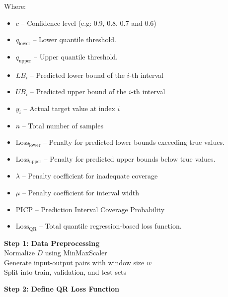 \begin{itemize}
    Where:
    \begin{itemize}
    \item $c$ – Confidence level (e.g: 0.9, 0.8, 0.7 and 0.6)
    \item $q_{\text{lower}}$ – Lower quantile threshold.
    \item $q_{\text{upper}}$ – Upper quantile threshold.
    \item $LB_i$ – Predicted lower bound of the $i$-th interval
    \item $UB_i$ – Predicted upper bound of the $i$-th interval
    \item $y_i$ – Actual target value at index $i$
    \item $n$ – Total number of samples
    \item $\text{Loss}_{\text{lower}}$ – Penalty for predicted lower bounds exceeding true values.
    \item $\text{Loss}_{\text{upper}}$ – Penalty for predicted upper bounds below true values.
    \item $\lambda$ – Penalty coefficient for inadequate coverage
    \item $\mu$ – Penalty coefficient for interval width
    \item $\text{PICP}$ – Prediction Interval Coverage Probability
    \item $\text{Loss}_{\text{QR}}$ – Total quantile regression-based loss function.
    \end{itemize}

        \begin{algorithm}[H]
        \footnotesize
        \SetAlgoCaptionSeparator{:}
    
    
        \textbf{Step 1: Data Preprocessing}\\
        Normalize $D$ using MinMaxScaler\\
        Generate input-output pairs with window size $w$\\
        Split into train, validation, and test sets
    
        \textbf{Step 2: Define QR Loss Function}\\
    

\end{algorithm}
\end{itemize}
